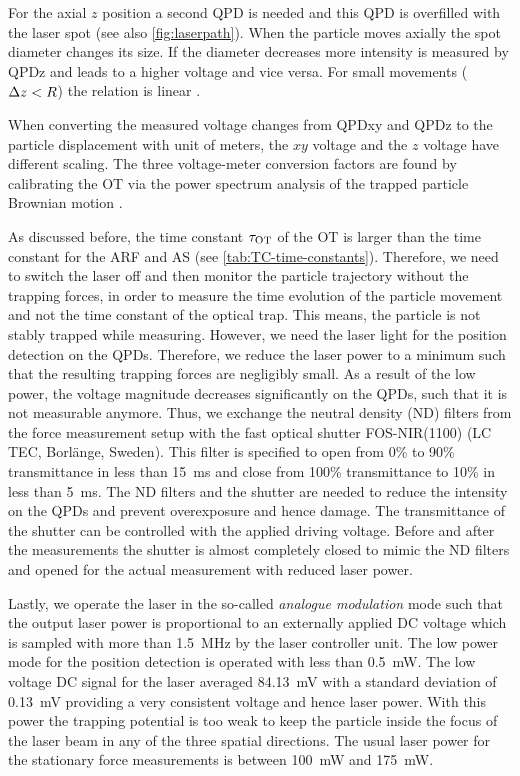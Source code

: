 For the axial $z$ position a second QPD is needed and this QPD is overfilled 
with the laser spot (see also \cref{fig:laserpath}). When the particle moves 
axially the spot diameter changes its size. If the diameter decreases more 
intensity is measured by QPDz and leads to a higher voltage and vice versa. For 
small movements ($\Delta z < R$) the relation is linear \cite{Dreyer2004}.

When converting the measured voltage changes from QPDxy and QPDz to the 
particle displacement with unit of meters, the $xy$ voltage and the $z$ voltage 
have different scaling. The three voltage-meter conversion factors are found by 
calibrating the OT via the power spectrum analysis of the trapped particle 
Brownian motion \cite{Lamprecht2021,Lamprecht2016,Lakaemper2015}.

As discussed before, the time constant $\tau_{\text{OT}}$ of the OT is larger than the 
time constant for the ARF and AS (see \cref{tab:TC-time-constants}). Therefore, we 
need to switch the laser off and then monitor the particle trajectory without 
the trapping forces, in order to measure the time evolution of the particle 
movement and not the time constant of the optical trap. This means, the particle 
is not stably trapped while measuring. However, we need the laser light for 
the position detection on the QPDs. Therefore, we reduce the laser power to a 
minimum such that the resulting trapping forces are negligibly small. As a 
result of the low power, the voltage magnitude decreases significantly on the 
QPDs, such that it is not measurable anymore. Thus, we exchange the neutral 
density (ND) filters from the force measurement setup 
\cite{Lamprecht2016,Lamprecht2021} with the fast optical shutter FOS-NIR(1100) 
(LC TEC, Borlänge, Sweden). This filter is specified to open from 0\% to 90\% 
transmittance in less than \SI{15}{\ms} and close from 100\% transmittance to 
10\% in less than \SI{5}{\ms}. The ND filters and the shutter are needed to 
reduce the intensity on the QPDs and prevent overexposure and hence damage. 
The transmittance of the shutter can be controlled with the applied driving 
voltage. Before and after the measurements the shutter is almost completely 
closed to mimic the ND filters and opened for the actual measurement with 
reduced laser power.

Lastly, we operate the laser in the so-called \emph{analogue modulation} mode 
such that the output laser power is proportional to an externally applied DC 
voltage which is sampled with more than \SI{1.5}{\MHz} by the laser controller 
unit. The low power mode for the position detection is operated with less than 
\SI{0.5}{\mW}. The low voltage DC signal for the laser averaged \SI{84.13}{\mV} 
with a standard deviation of \SI{0.13}{\mV} providing a very consistent voltage 
and hence laser power. With this power the trapping potential is too weak to 
keep the particle inside the focus of the laser beam in any of the three 
spatial directions. The usual laser power for the stationary force measurements 
is between \SI{100}{\mW} and \SI{175}{\mW}.

